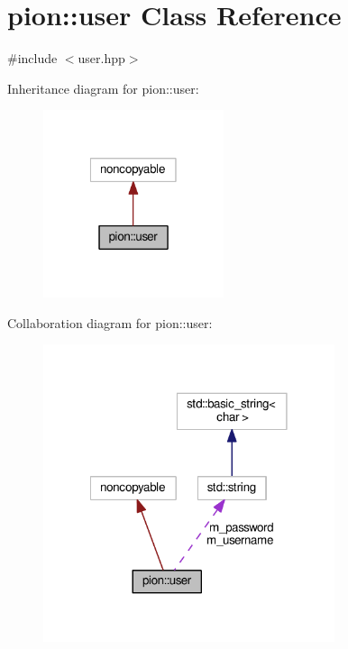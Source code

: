 \hypertarget{classpion_1_1user}{\section{pion\-:\-:user Class Reference}
\label{classpion_1_1user}
}


{\ttfamily \#include $<$user.\-hpp$>$}



Inheritance diagram for pion\-:\-:user\-:
\nopagebreak
\begin{figure}[H]
\begin{center}
\leavevmode
\includegraphics[width=150pt]{classpion_1_1user__inherit__graph}
\end{center}
\end{figure}


Collaboration diagram for pion\-:\-:user\-:
\nopagebreak
\begin{figure}[H]
\begin{center}
\leavevmode
\includegraphics[width=242pt]{classpion_1_1user__coll__graph}
\end{center}
\end{figure}

